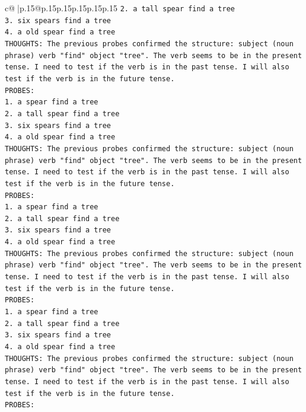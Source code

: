 \documentclass{article}
\begin{document}
{\begin{supertabular}{c@{$\;$}|p{.15\linewidth}@{}p{.15\linewidth}p{.15\linewidth}p{.15\linewidth}p{.15\linewidth}p{.15\linewidth}}
{{{\texttt{2. a tall spear find a tree} \\
\texttt{3. six spears find a tree} \\
\texttt{4. a old spear find a tree} \\
\texttt{THOUGHTS: The previous probes confirmed the structure: subject (noun phrase) verb "find" object "tree". The verb seems to be in the present tense. I need to test if the verb is in the past tense. I will also test if the verb is in the future tense.} \\
\texttt{PROBES:} \\
\texttt{1. a spear find a tree} \\
\texttt{2. a tall spear find a tree} \\
\texttt{3. six spears find a tree} \\
\texttt{4. a old spear find a tree} \\
\texttt{THOUGHTS: The previous probes confirmed the structure: subject (noun phrase) verb "find" object "tree". The verb seems to be in the present tense. I need to test if the verb is in the past tense. I will also test if the verb is in the future tense.} \\
\texttt{PROBES:} \\
\texttt{1. a spear find a tree} \\
\texttt{2. a tall spear find a tree} \\
\texttt{3. six spears find a tree} \\
\texttt{4. a old spear find a tree} \\
\texttt{THOUGHTS: The previous probes confirmed the structure: subject (noun phrase) verb "find" object "tree". The verb seems to be in the present tense. I need to test if the verb is in the past tense. I will also test if the verb is in the future tense.} \\
\texttt{PROBES:} \\
\texttt{1. a spear find a tree} \\
\texttt{2. a tall spear find a tree} \\
\texttt{3. six spears find a tree} \\
\texttt{4. a old spear find a tree} \\
\texttt{THOUGHTS: The previous probes confirmed the structure: subject (noun phrase) verb "find" object "tree". The verb seems to be in the present tense. I need to test if the verb is in the past tense. I will also test if the verb is in the future tense.} \\
\texttt{PROBES:} \\
}}}
\end{supertabular}}
\end{document}
